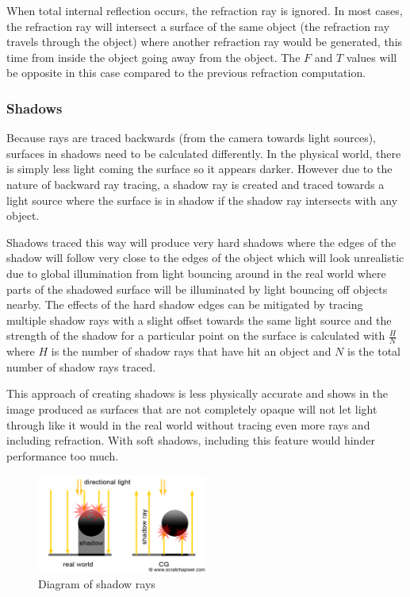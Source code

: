 \documentclass[final]{cmpreport}
\begin{document}
When total internal reflection occurs, the refraction ray is ignored. In most cases, the refraction ray will intersect a surface of the same object (the refraction ray travels through the object) where another refraction ray would be generated, this time from inside the object going away from the object. The $F$ and $T$ values will be opposite in this case compared to the previous refraction computation.

\subsubsection{Shadows}

Because rays are traced backwards (from the camera towards light sources), surfaces in shadows need to be calculated differently. In the physical world, there is simply less light coming the surface so it appears darker. However due to the nature of backward ray tracing, a shadow ray is created and traced towards a light source where the surface is in shadow if the shadow ray intersects with any object.

Shadows traced this way will produce very hard shadows where the edges of the shadow will follow very close to the edges of the object which will look unrealistic due to global illumination from light bouncing around in the real world where parts of the shadowed surface will be illuminated by light bouncing off objects nearby. The effects of the hard shadow edges can be mitigated by tracing multiple shadow rays with a slight offset towards the same light source and the strength of the shadow for a particular point on the surface is calculated with $\frac{H}{N}$ where $H$ is the number of shadow rays that have hit an object and $N$ is the total number of shadow rays traced.

This approach of creating shadows is less physically accurate and shows in the image produced as surfaces that are not completely opaque will not let light through like it would in the real world without tracing even more rays and including refraction. With soft shadows, including this feature would hinder performance too much.

\begin{figure}
    \centering
    \includegraphics[width=0.5\textwidth]{img/shadow_diagram.png}
    \caption{Diagram of shadow rays \citep{scratchshadow}}
\end{figure}
\end{document}
